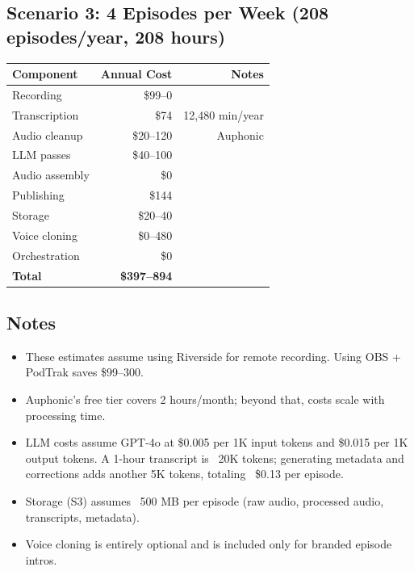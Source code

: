 \documentclass[11pt,letterpaper]{article}
\begin{document}
\subsection{Scenario 3: 4 Episodes per Week (208 episodes/year, 208 hours)}

\begin{center}
\begin{tabular}{lrr}
\toprule
\textbf{Component} & \textbf{Annual Cost} & \textbf{Notes} \\
\midrule
Recording & \$99–0 & \\
Transcription & \$74 & 12,480 min/year \\
Audio cleanup & \$20–120 & Auphonic \\
LLM passes & \$40–100 & \\
Audio assembly & \$0 & \\
Publishing & \$144 & \\
Storage & \$20–40 & \\
Voice cloning & \$0–480 & \\
Orchestration & \$0 & \\
\midrule
\textbf{Total} & \textbf{\$397–894} & \\
\bottomrule
\end{tabular}
\end{center}

\subsection{Notes}

\begin{itemize}
  \item These estimates assume using Riverside for remote recording. Using OBS + PodTrak saves \$99–300.
  \item Auphonic's free tier covers 2 hours/month; beyond that, costs scale with processing time.
  \item LLM costs assume GPT-4o at \$0.005 per 1K input tokens and \$0.015 per 1K output tokens. A 1-hour transcript is ~20K tokens; generating metadata and corrections adds another 5K tokens, totaling ~\$0.13 per episode.
  \item Storage (S3) assumes ~500 MB per episode (raw audio, processed audio, transcripts, metadata).
  \item Voice cloning is entirely optional and is included only for branded episode intros.
\end{itemize}

\vspace{12pt}
\end{document}
